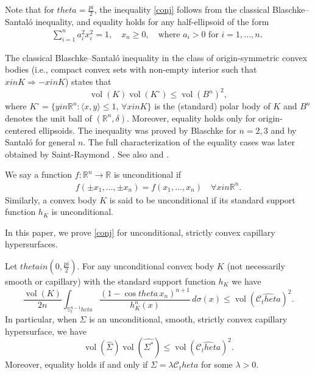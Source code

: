 \documentclass[12pt]{amsart}
\def\theta{theta}%
\def\pi{pi}%
\def\in{in }%
\numberwithin{equation}{section}
\newcommand{\bbR}{\mathbb{R}}
\newcommand{\8}{\infty}
\newcommand{\si}{\sigma}
\DeclareMathOperator{\vol}{vol}
\renewcommand{\(}{\left(}
\renewcommand{\)}{\right)}
\newcommand{\eq}[1]{\begin{equation}\begin{alignedat}{2} #1 \end{alignedat}\end{equation}}
\newcommand{\q}{\quad}
\begin{document}
Note that for $\theta = \tfrac{\pi}{2}$, the inequality \eqref{conj} follows from the classical 
Blaschke--Santal\'o inequality, and equality holds for any half-ellipsoid of the form
\eq{
\sum_{i=1}^na_i^2x_i^2=1,\q  x_n\geq 0,\q \text{where $a_i>0$ for $i=1,\ldots, n$. } 
}

 The classical Blaschke--Santal\'o inequality in the class of origin-symmetric convex bodies (i.e., compact convex sets with non-empty interior such that $x \in K \Rightarrow -x \in K$) states that
\begin{equation}\label{eq:BS}
\vol(K)\vol(K^{\circ}) \leq \vol(B^n)^2,
\end{equation}
where $K^{\circ} = \{y \in \mathbb{R}^n : \langle x, y \rangle \leq 1, \, \forall x \in K\}$ is the (standard) polar body of $K$ and $B^n$ denotes the unit ball of $(\mathbb{R}^n, \delta)$. Moreover, equality holds only for origin-centered ellipsoids. The inequality was proved by Blaschke \cite{Bla45} for $n = 2, 3$ and by Santal\'o \cite{San49} for general $n$. The full characterization of the equality cases was later obtained by Saint-Raymond \cite{SR80}. See also \cite{MP90} and \cite{AAKM04}.

We say a function $f:\bbR^n\to \bbR$ is unconditional if
\eq{
f(\pm x_1,\ldots,\pm x_n)=f(x_1,\ldots,x_n) \quad \forall x\in \bbR^n.
}
Similarly, a convex body $K$ is said to be unconditional if its standard support function $h_K$ is unconditional. 

In this paper, we prove \eqref{conj} for unconditional, strictly convex capillary hypersurfaces.

\begin{thm}\label{thm 1}
Let $\theta \in \left(0, \frac{\pi}{2}\right)$. For any unconditional convex body $K$ (not necessarily smooth or capillary) with the standard support function $h_K$ we have
\begin{equation}
\frac{\vol(K)}{2n} 
\int_{\mathbb{S}^{n-1}_\theta} 
\frac{(1 - \cos\theta \, x_n)^{n+1}}{h_K^n(x)} \, d\si(x) 
\leq \vol(\widehat{\mathcal{C}_\theta})^2.
\end{equation}
In particular, when $\Sigma$ is an unconditional, smooth, strictly convex capillary hypersurface, we have
\begin{equation}
\vol(\widehat{\Sigma}) 
\vol(\widehat{\Sigma^*}) 
\leq \vol(\widehat{\mathcal{C}_\theta})^2.
\end{equation}
Moreover, equality holds if and only if 
$\Sigma = \lambda \mathcal{C}_\theta$ for some $\lambda > 0$.
\end{thm}
\end{document}
